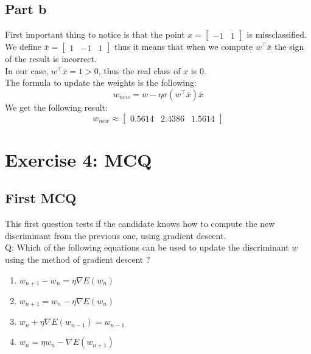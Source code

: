 \documentclass[a4paper, 10pt]{article}
\begin{document}
\subsection{Part b}
First important thing to notice is that the point $x=\begin{bmatrix}-1 & 1\end{bmatrix}$ is missclassified.
We define $\bar{x} = \begin{bmatrix}1 & -1 & 1\end{bmatrix}$ thus it means that when we compute 
$w^\top \bar{x}$ the sign of the result is incorrect.
\\
In our case, $w^\top \bar{x} = 1 >0$, thus the real class of $x$ is $0$.
\\
The formula to update the weights is the following:
$$
w_{new} = w - \eta \sigma(w^\top \bar{x})\bar{x}
$$
We get the following result:
$$
w_{new} \approx \begin{bmatrix}0.5614 & 2.4386 & 1.5614\end{bmatrix}
$$



\section{Exercise 4: MCQ}
\subsection{First MCQ}
This first question tests if the candidate knows how to compute the new
discriminant from the previous one, using gradient descent.
\\
Q: Which of the following equations can be used to update the discriminant $w$ using
the method of gradient descent ?
\\
\begin{enumerate}
    \item $w_{n+1} - w_{n} =  \eta \nabla E(w_{n})$
    \item $w_{n+1} = w_{n} - \eta \nabla E(w_{n})$
    \item $w_{n} + \eta \nabla E(w_{n-1}) = w_{n-1} $
    \item $w_{n} = \eta w_{n} - \nabla E(w_{n+1})$
\end{enumerate}
\end{document}
